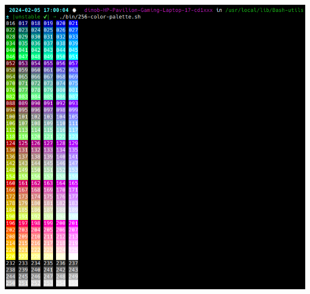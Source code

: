 \documentclass[a4paper,10pt]{article}
\begin{document}
    \begin{justify}
    	\includegraphics[scale=0.5884]{../../../00 DATA/img/XTERM palette table.png}
    \end{justify}




\end{document}
